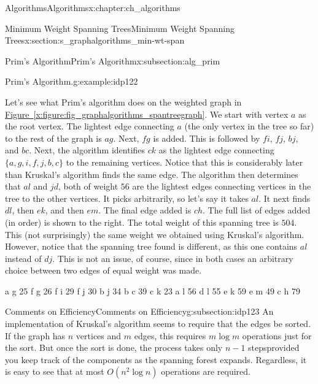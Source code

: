 \documentclass[oneside,10pt,]{book}
\newcommand{\xreffont}{\relax}
\numberwithin{equation}{section}
\begin{document}
\begin{chapterptx}{Algorithms}{}{Algorithms}{}{}{x:chapter:ch_algorithms}
\begin{sectionptx}{Minimum Weight Spanning Trees}{}{Minimum Weight Spanning Trees}{}{}{x:section:s_graphalgorithms_min-wt-span}
\begin{subsectionptx}{Prim's Algorithm}{}{Prim's Algorithm}{}{}{x:subsection:alg_prim}
\begin{example}{Prim's Algorithm.}{g:example:idp122}
\begin{sidebyside}{2}{0.0125}{0.0125}{0.025}
\begin{sbspanel}{0.78}
Let's see what Prim's algorithm does on the weighted graph in \hyperref[x:figure:fig_graphalgorithms_spantreegraph]{Figure~{\xreffont\ref{x:figure:fig_graphalgorithms_spantreegraph}}}. We start with vertex \(a\) as the root vertex. The lightest edge connecting \(a\) (the only vertex in the tree so far) to the rest of the graph is \(ag\). Next, \(fg\) is added. This is followed by \(fi\), \(fj\), \(bj\), and \(bc\). Next, the algorithm identifies \(ck\) as the lightest edge connecting \(\{a,g,i,f,j,b,c\}\) to the remaining vertices. Notice that this is considerably later than Kruskal's algorithm finds the same edge. The algorithm then determines that \(al\) and \(jd\), both of weight \(56\) are the lightest edges connecting vertices in the tree to the other vertices. It picks arbitrarily, so let's say it takes \(al\). It next finds \(dl\), then \(ek\), and then \(em\). The final edge added is \(ch\). The full list of edges added (in order) is shown to the right. The total weight of this spanning tree is \(504\). This (not surprisingly) the same weight we obtained using Kruskal's algorithm. However, notice that the spanning tree found is different, as this one contains \(al\) instead of \(dj\). This is not an issue, of course, since in both cases an arbitrary choice between two edges of equal weight was made.%
\end{sbspanel}%
\begin{sbspanel}{0.17}%
\begin{preformatted}
a g 25
f g 26
f i 29
f j 30
b j 34
b c 39
c k 23
a l 56
d l 55
e k 59
e m 49
c h 79
\end{preformatted}
\end{sbspanel}%
\end{sidebyside}%
\end{example}
\end{subsectionptx}
%
%
\typeout{************************************************}
\typeout{************************************************}
%
\begin{subsectionptx}{Comments on Efficiency}{}{Comments on Efficiency}{}{}{g:subsection:idp123}
An implementation of Kruskal's algorithm seems to require that the edges be sorted. If the graph has \(n\) vertices and \(m\) edges, this requires \(m\log m\) operations just for the sort. But once the sort is done, the process takes only \(n-1\) steps\textemdash{}provided you keep track of the components as the spanning forest expands.  Regardless, it is easy to see that at most \(O(n^2\log n)\) operations are required.%

\end{subsectionptx}
\end{sectionptx}
\end{chapterptx}
\end{document}
